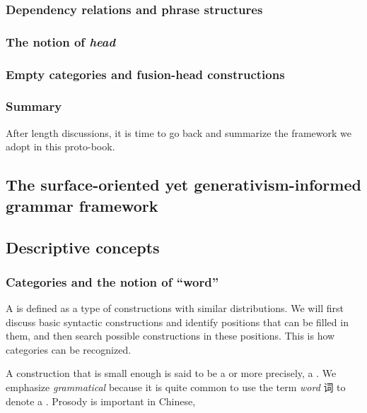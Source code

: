 \documentclass[../main.tex]{subfiles}
\begin{document}
\subsubsection{Dependency relations and phrase structures}

\subsubsection{The notion of \emph{head}}\label{sec:headedness}

\subsubsection{Empty categories and fusion-head constructions}

\subsubsection{Summary}

After length discussions, it is time to go back and summarize the framework we adopt in this proto-book.

\subsection{The surface-oriented yet generativism-informed grammar framework} 

\subsection{Descriptive concepts}


\subsubsection{Categories and the notion of ``word''}

A  is defined as a type of constructions with similar distributions.
We will first discuss basic syntactic constructions and identify positions that can be filled in them, 
and then search possible constructions in these positions. This is how categories can be recognized.

A construction that is small enough is said to be a  or more precisely, 
a .
We emphasize \emph{grammatical} because it is quite common to use the term \emph{word} 词 to denote 
a . Prosody is important in Chinese, %
\end{document}
